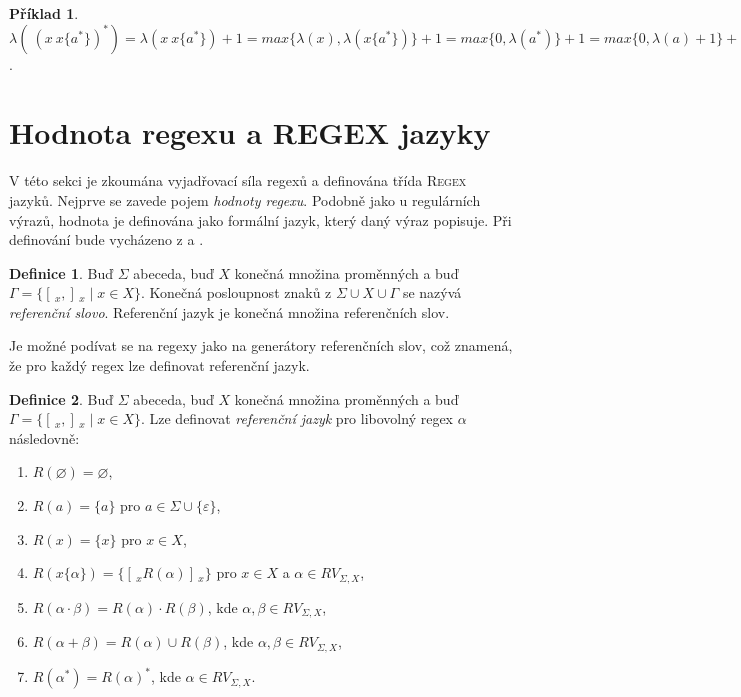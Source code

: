 \documentclass[thesis=B,czech]{FITthesis}[2019/12/23]
\theoremstyle{definition}
\newtheorem{definition}{Definice}[chapter]
\newtheorem{example}{Příklad}[chapter]
\begin{document}
\begin{example}
	$\lambda( \ (x \ x\{a^\ast\})^\ast) = \lambda(x \ x\{a^\ast\})+1=max\{\lambda(x), \lambda(x\{a^\ast\})\}+1=max\{0, \lambda(a^\ast)\}+1=max\{0, \lambda(a)+1\}+1=max\{0, 1\}+1 = 2$.
\end{example}

\section {Hodnota regexu a REGEX jazyky}
V této sekci je zkoumána vyjadřovací síla regexů a definována třída \textsc{Regex} jazyků. Nejprve se zavede pojem \emph{hodnoty regexu}. Podobně jako u regulárních výrazů, hodnota je definována jako formální jazyk, který daný výraz popisuje. Při definování bude vycházeno z \cite{fsdeter} a \cite{schmidrefwords}.

\begin{definition}
Buď $\Sigma$ abeceda, buď $X$ konečná množina proměnných a buď $\Gamma = \{ [\,_x , ]\,_x \mid x \in X \}$. Konečná posloupnost znaků z $\Sigma \cup X \cup \Gamma$ se nazývá \emph{referenční slovo}. Referenční jazyk je konečná množina referenčních slov. \cite{schmidrefwords}
\end{definition}

Je možné podívat se na regexy jako na generátory referenčních slov, což znamená, že pro každý regex lze definovat referenční jazyk.

\begin{definition}
Buď $\Sigma$ abeceda, buď $X$ konečná množina proměnných a buď $\Gamma = \{ [\,_x , ]\,_x \mid x \in X \}$. Lze definovat \emph{referenční jazyk} pro libovolný regex $\alpha$ následovně:
\begin{enumerate}
	\item{$R\left(\varnothing\right) = \varnothing$,}
	\item{$R\left(a\right) = \{a\} $ pro $ a \in \Sigma \cup \{ \varepsilon \}$,}
        \item{$R\left(x\right) = \{x\} $ pro $ x \in X$,}
        \item\label{rule:4}{$R\left(x\{ \alpha \}\right) = \{ [\,_x R\left( \alpha \right)  ]\,_x \}$ pro $x \in X$ a $\alpha \in RV_{\Sigma, X}$,}
        \item{$R\left(\alpha\cdot\beta\right) = R\left(\alpha\right)\cdot R\left(\beta\right)$, kde $\alpha, \beta \in RV_{\Sigma, X}$,}
        \item{$R\left(\alpha + \beta\right) = R\left(\alpha\right)\cup R\left(\beta\right)$, kde $\alpha, \beta \in RV_{\Sigma, X}$,}
        \item{$R\left(\alpha^\ast\right) = R\left(\alpha\right)^\ast$, kde $\alpha \in RV_{\Sigma, X}$. \cite{fsdeter}}
\end{enumerate}
\end{definition}
\end{document}
